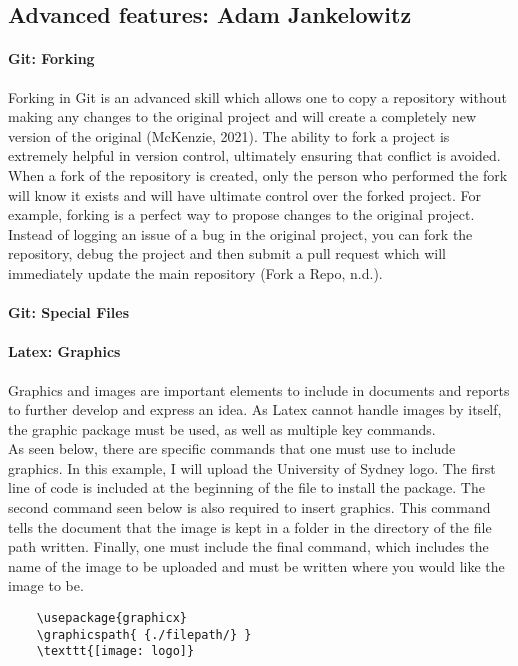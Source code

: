 \documentclass[a4paper, 11pt]{report}
\begin{document}
	\subsection{Advanced features: Adam Jankelowitz}
    \paragraph{Git: Forking} Forking in Git is an advanced skill which allows one to copy a repository without making any changes to the original project and will create a completely new version of the original (McKenzie, 2021). The ability to fork a project is extremely helpful in version control, ultimately ensuring that conflict is avoided. When a fork of the repository is created, only the person who performed the fork will know it exists and will have ultimate control over the forked project. For example, forking is a perfect way to propose changes to the original project. Instead of logging an issue of a bug in the original project, you can fork the repository, debug the project and then submit a pull request which will immediately update the main repository (Fork a Repo, n.d.). 
    
    
    \paragraph{Git: Special Files}
    
    
    \paragraph{Latex: Graphics} Graphics and images are important elements to include in documents and reports to further develop and express an idea. As Latex cannot handle images by itself, the graphic package must be used, as well as multiple key commands.
    \\
    As seen below, there are specific commands that one must use to include graphics. In this example, I will upload the University of Sydney logo. The first line of code is included at the beginning of the file to install the package. The second command seen below is also required to insert graphics. This command tells the document that the image is kept in a folder in the directory of the file path written. Finally, one must include the final command, which includes the name of the image to be uploaded and must be written where you would like the image to be.

    \begin{verbatim}
    \usepackage{graphicx}
    \graphicspath{ {./filepath/} } 
    \texttt{[image: logo]}
    \end{verbatim}
\end{document}
